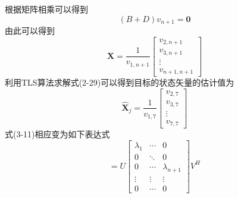 根据矩阵相乘可以得到
\begin{equation}
	(B+D)v_{n+1} = \bm{0} 
\end{equation}
由此可以得到
\begin{equation}
	\bm{X} = \frac{1}{v_{1,n+1}}\left[\begin{array}{c}
		v_{2,n+1} \\ v_{3,n+1} \\ \vdots \\ v_{n+1,n+1}
	\end{array}\right]
\end{equation}
利用TLS算法求解式(2-29)可以得到目标的状态矢量的估计值为
\begin{equation}
	\hat{\bm{X}}_j = \frac{1}{v_{1,7}}\left[\begin{array}{c}
		v_{2,7} \\ v_{3,7} \\ \vdots \\ v_{7,7}
	\end{array}\right]
\end{equation}
式(3-11)相应变为如下表达式
\begin{equation}
	[-b^* \quad A^*] =  U \left[\begin{array}{ccc}
		\lambda_1 & \cdots & 0 \\
		0& \ddots & 0 \\
		0 & \cdots & \lambda_{n+1} \\
		\vdots & \vdots & \vdots \\
		0 & \cdots & 0
	\end{array}\right] V^H
\end{equation}
